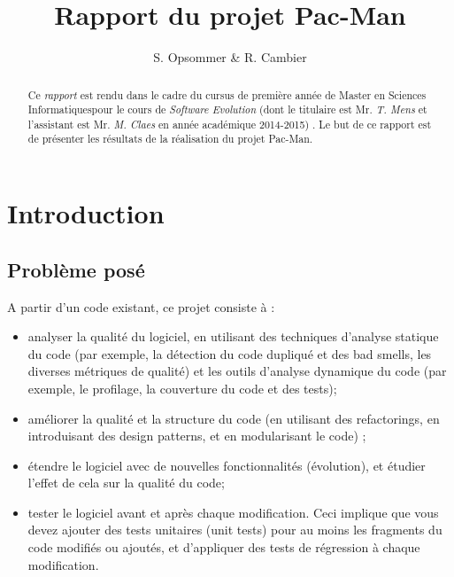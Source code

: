 \documentclass[12pt,a4paper,final]{article}
\author{S. Opsommer \& R. Cambier}
\title{Rapport du projet Pac-Man}
\begin{document}
\umonsCoverPage
\pagebreak
\pagestyle{fancy}
\newpage
\thispagestyle{empty}
\begin{abstract}
Ce \emph{rapport} est rendu dans le cadre du cursus de première année de \og Master en Sciences Informatiques\fg  pour le cours de \emph{Software Evolution} (dont le titulaire est Mr. \emph{T. Mens} et l'assistant est Mr. \emph{M. Claes} en année académique 2014-2015) . Le but de ce rapport est de présenter les résultats de la réalisation du projet Pac-Man.
\end{abstract}


\newpage
\thispagestyle{empty}
\tableofcontents
\newpage
\section{Introduction}\label{sec:intro}
\subsection{Problème posé}
A partir d'un code existant, ce projet consiste à : 
\begin{itemize}
\item analyser la qualité du logiciel, en utilisant des techniques d'analyse statique du code (par exemple, la détection du code dupliqué et des bad smells, les diverses métriques de qualité) et les outils d'analyse dynamique du code (par exemple, le profilage, la couverture du code et des tests);
\item améliorer la qualité et la structure du code (en utilisant des refactorings, en introduisant des design patterns, et en modularisant le code) ;
\item étendre le logiciel avec de nouvelles fonctionnalités (évolution), et étudier l'effet de cela sur la qualité du code;
\item tester le logiciel avant et après chaque modification. Ceci implique que vous devez ajouter des tests unitaires (unit tests) pour au moins les fragments du code modifiés ou ajoutés, et d'appliquer des tests de régression à chaque modification.
\end{itemize}
\end{document}
